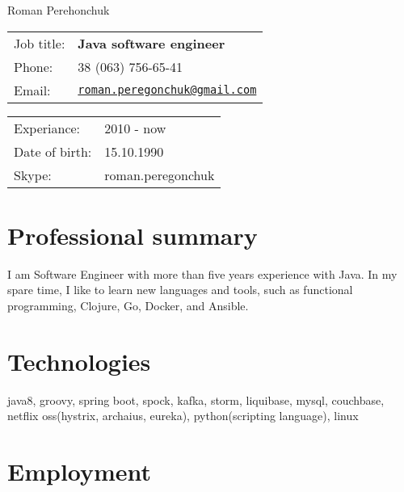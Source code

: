 \documentclass[letterpaper]{article}
\def\name{Roman Perehonchuk}
\renewenvironment{itemize}{
  \begin{list}{}{
    \setlength{\leftmargin}{1.5em}
  }
}{
  \end{list}
}
\begin{document}
{\huge \name}


\vspace{0.25in}

\begin{minipage}{0.45\linewidth}
  \begin{tabular}{ll}
    Job title: & \textbf{Java software engineer} \\
    Phone: & 38 (063) 756-65-41 \\
    Email: & \href{mailto:roman.peregonchuk@gmail.com}{\tt roman.peregonchuk@gmail.com} \\
  \end{tabular}
\end{minipage}
\begin{minipage}{0.45\linewidth}
  \begin{tabular}{ll}
    Experiance: & 2010 - now \\
    Date of birth: & 15.10.1990 \\
    Skype: & roman.peregonchuk \\
  \end{tabular}
\end{minipage}

\section*{Professional summary}
\begin{itemize}
\item I am Software Engineer with more than five years experience with Java. In my spare time, I like to learn new languages and tools, such as functional programming, Clojure, Go, Docker, and Ansible.
\end{itemize}

\section*{Technologies}

\begin{itemize}
\item java8, groovy, spring boot, spock, kafka, storm, liquibase, mysql, couchbase, netflix oss(hystrix, archaius, eureka), python(scripting language), linux  
\end{itemize}

\section*{Employment}
\end{document}
